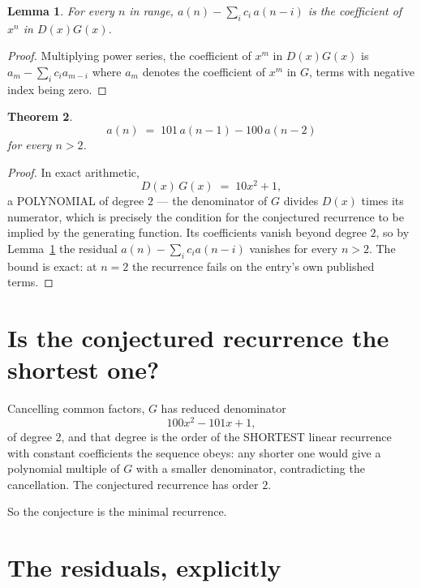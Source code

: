 \documentclass[11pt,a4paper]{article}
\theoremstyle{plain}
\newtheorem{theorem}{Theorem}
\newtheorem{lemma}[theorem]{Lemma}
\theoremstyle{definition}
\begin{document}
\begin{lemma}\label{lem:key}
For every $n$ in range, $a(n)-\sum_i c_i\,a(n-i)$ is the coefficient of $x^{n}$ in
$D(x)G(x)$.
\end{lemma}

\begin{proof}
Multiplying power series, the coefficient of $x^{m}$ in $D(x)G(x)$ is
$a_m-\sum_i c_i a_{m-i}$ where $a_m$ denotes the coefficient of $x^{m}$ in $G$, terms with
negative index being zero.
\end{proof}

\begin{theorem}
\[
a(n)\;=\;101\,a(n-1) - 100\,a(n-2)
\]
for every $n>2$.
\end{theorem}

\begin{proof}
In exact arithmetic,
\[
D(x)\,G(x)\;=\;10 x^{2} + 1,
\]
a POLYNOMIAL of degree $2$ --- the denominator of $G$ divides $D(x)$ times its numerator,
which is precisely the condition for the conjectured recurrence to be implied by the
generating function. Its coefficients vanish beyond degree $2$, so by
Lemma~\ref{lem:key} the residual $a(n)-\sum_ic_ia(n-i)$ vanishes for every
$n>2$. The bound is exact: at $n=2$ the recurrence fails on the entry's own published terms.
\end{proof}

\section{Is the conjectured recurrence the shortest one?}

Cancelling common factors, $G$ has reduced denominator
\[
100 x^{2} - 101 x + 1,
\]
of degree $2$, and that degree is the order of the SHORTEST linear recurrence with
constant coefficients the sequence obeys: any shorter one would give a polynomial multiple of
$G$ with a smaller denominator, contradicting the cancellation. The conjectured recurrence has
order $2$.

So the conjecture is the minimal recurrence.

\section{The residuals, explicitly}
\end{document}
